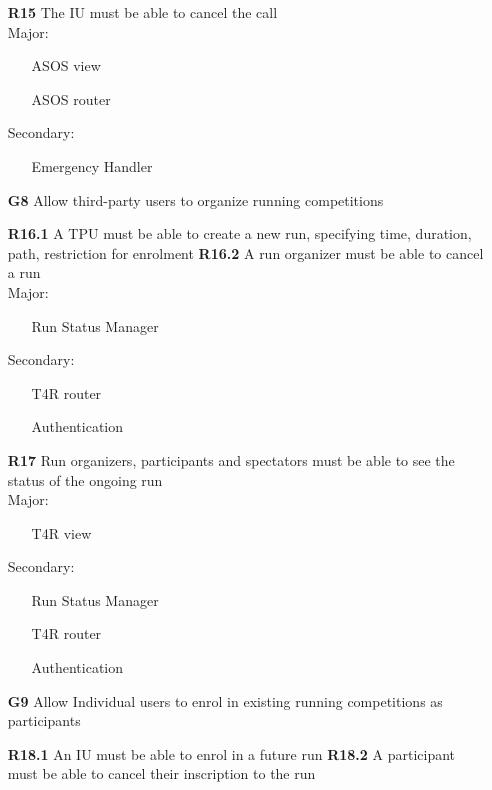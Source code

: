 \begin{itemize}
\subitem \textbf{R15} The IU must be able to cancel the call\\

Major:
\begin{itemize}
\item[\textbullet]ASOS view
\item[\textbullet]ASOS router
\end{itemize}
Secondary:
\begin{itemize}
\item[\textbullet] Emergency Handler
\end{itemize}

\item [\textbf{G8}] Allow third-party users to organize running competitions

\subitem \textbf{R16.1} A TPU must be able to create a new run, specifying time, duration, path, restriction for enrolment
\subitem \textbf{R16.2} A run organizer must be able to cancel a run \\

Major:
\begin{itemize}
\item[\textbullet]Run Status Manager
\end{itemize}
Secondary:
\begin{itemize}
\item[\textbullet]T4R router
\item[\textbullet]Authentication
\end{itemize}

\subitem \textbf{R17} Run organizers, participants and spectators must be able to see the status of the ongoing run\\

Major:
\begin{itemize}
\item[\textbullet]T4R view
\end{itemize}
Secondary:
\begin{itemize}
\item[\textbullet]Run Status Manager
\item[\textbullet]T4R router
\item[\textbullet]Authentication
\end{itemize}
\item [\textbf{G9}] Allow Individual users to enrol in existing running competitions as participants

\subitem \textbf{R18.1} An IU must be able to enrol in a future run
\subitem \textbf{R18.2} A participant must be able to cancel their inscription to the run \\


\end{itemize}
